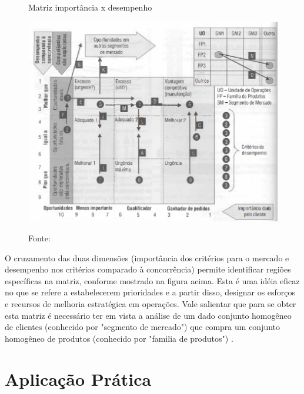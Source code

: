 \begin{figure}[H]
  \caption{Matriz importância x desempenho}
  \includegraphics[width =1\textwidth]{images/impor_desem.png}
  \label{fig:matriz_importancia_desempenho}
  \caption*{Fonte: \cite{correa2000administracao}}
\end{figure}

O cruzamento das duas dimensões (importância dos critérios para o mercado e desempenho nos critérios comparado à concorrência) permite identificar regiões específicas na matriz, conforme mostrado na figura acima. Esta é uma idéia eficaz no que se refere a estabelecerem prioridades e a partir disso, designar os esforços e recursos de melhoria estratégica em operações. Vale salientar que para se obter esta matriz é necessário ter em vista a análise de um dado conjunto homogêneo de clientes (conhecido por "segmento de mercado") que compra um conjunto homogêneo de produtos (conhecido por "familia de produtos") \cite{correa2000administracao}.   




\section{Aplicação Prática} 
\label{sec:estrategia_da_producao_aplicacao}